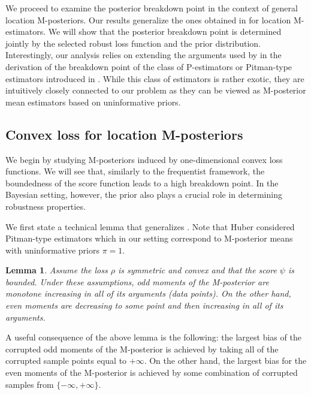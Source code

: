 \documentclass[11pt, oneside]{amsart}
\newtheorem{lemma}{Lemma}
\theoremstyle{definition}   %
\newcommand{\loss}{\rho}
\newcommand{\score}{\psi}
\begin{document}
%
We proceed to examine the posterior breakdown point in the context of general location  M-posteriors. Our results generalize the ones obtained in \cite{donoho:huber1983} for location M-estimators. We will show that the posterior breakdown point is determined jointly by the selected robust loss function and the prior distribution. Interestingly, our analysis relies on extending the arguments used by \cite{huber1984} in the derivation of the breakdown point of the class of P-estimators or Pitman-type estimators introduced in \cite{johns1979}. While this class of estimators is rather exotic, they are intuitively closely connected to our problem as they can be viewed as M-posterior mean estimators based on uninformative priors.

\subsection{Convex loss for location M-posteriors}
%
We begin by studying M-posteriors induced by one-dimensional convex loss functions. We will see that, similarly to the frequentist framework, the boundedness of the score function leads to a high breakdown point. 
In the Bayesian setting, however, the prior also plays a crucial role in determining robustness properties. 

%

We first state a technical lemma that generalizes \cite[Lemma 5.1]{huber1984}. Note that Huber considered Pitman-type estimators which in our setting correspond to M-posterior means with uninformative priors \(\pi = 1\).
\begin{lemma}
\label{lemma::posterior-moments-monotone}
   Assume the loss \( \loss \) is symmetric and convex and that the score \( \score \) is bounded. Under these assumptions, odd moments of the M-posterior are monotone increasing in all of its arguments (data points). On the other hand, even moments are decreasing to some point and then increasing in all of its arguments.
\end{lemma}
%
%
A useful consequence of the above lemma is the following: the largest bias of the corrupted odd moments of the M-posterior is achieved by taking all of the corrupted sample points equal to \( +\infty\). On the other hand, the largest bias for the even moments of the M-posterior is achieved by some combination of corrupted samples from \( \{ -\infty, +\infty \}\).
\end{document}
